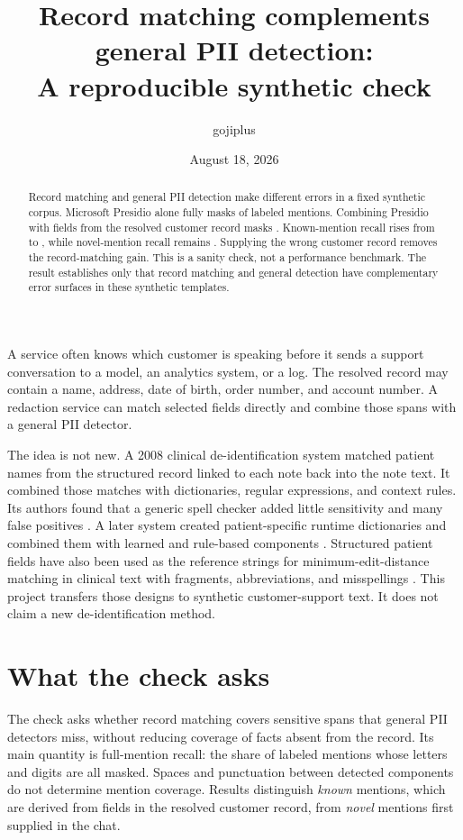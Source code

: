 \documentclass[11pt]{article}
\title{Record matching complements general PII detection:\\
A reproducible synthetic check}
\author{gojiplus}
\date{August 18, 2026}
\begin{document}
\maketitle

\begin{abstract}
Record matching and general PII detection make different errors in a fixed
synthetic corpus. Microsoft Presidio alone fully masks
\AllPresidioMentionRecall{} of labeled mentions. Combining Presidio with fields
from the resolved customer record masks \AllPresidioRecordMentionRecall{}.
Known-mention recall rises from \AllPresidioKnownRecall{} to
\AllPresidioRecordKnownRecall{}, while novel-mention recall remains
\AllPresidioNovelRecall{}. Supplying the wrong customer record removes the
record-matching gain. This is a sanity check, not a performance benchmark. The
result establishes only that record matching and general detection have
complementary error surfaces in these synthetic templates.
\end{abstract}

A service often knows which customer is speaking before it sends a support
conversation to a model, an analytics system, or a log. The resolved record may
contain a name, address, date of birth, order number, and account number. A
redaction service can match selected fields directly and combine those spans
with a general PII detector.

The idea is not new. A 2008 clinical de-identification system matched patient
names from the structured record linked to each note back into the note text. It
combined those matches with dictionaries, regular expressions, and context
rules. Its authors found that a generic spell checker added little sensitivity
and many false positives \citep{neamatullah2008}. A later system created
patient-specific runtime dictionaries and combined them with learned and
rule-based components
\citep{dehghan2015}. Structured patient fields have also been used as the
reference strings for minimum-edit-distance matching in clinical text with
fragments, abbreviations, and misspellings \citep{yuwono2016}. This project
transfers those designs to synthetic customer-support text. It does not claim a
new de-identification method.

\section*{What the check asks}

The check asks whether record matching covers sensitive spans that general PII
detectors miss, without reducing coverage of facts absent from the record. Its
main quantity is full-mention recall: the share of labeled mentions whose
letters and digits are all masked. Spaces and punctuation between detected
components do not determine mention coverage. Results distinguish \emph{known}
mentions, which are derived from fields in the resolved customer record, from
\emph{novel} mentions first supplied in the chat.
\end{document}
